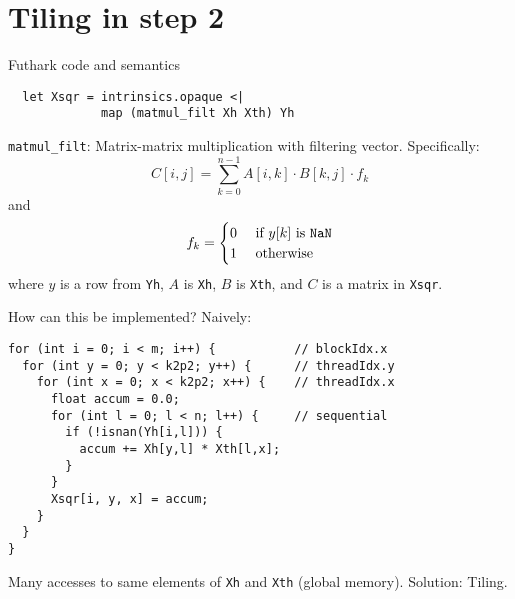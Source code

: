 

\section{Tiling in step 2}

\begin{frame}[fragile]{Futhark code and semantics}
\begin{verbatim}
  let Xsqr = intrinsics.opaque <|
             map (matmul_filt Xh Xth) Yh
\end{verbatim}
\texttt{matmul\_filt}: Matrix-matrix multiplication with filtering vector.
Specifically:
\[
  C[i,j]=\sum\limits_{k=0}^{n-1} A[i,k]\cdot B[k,j]\cdot f_k
\]
and
\[
  f_k =
  \begin{cases}
    0 & \mbox{ if } y[k] \mbox{ is \texttt{NaN}} \\
    1 & \mbox{ otherwise }
  \end{cases}
\]
where \(y\) is a row from \texttt{Yh}, \(A\) is \texttt{Xh}, \(B\) is
\texttt{Xth}, and \(C\) is a matrix in \texttt{Xsqr}.
\end{frame}

\begin{frame}[fragile]{How can this be implemented?}
  Naively:
\begin{verbatim}
for (int i = 0; i < m; i++) {           // blockIdx.x
  for (int y = 0; y < k2p2; y++) {      // threadIdx.y
    for (int x = 0; x < k2p2; x++) {    // threadIdx.x
      float accum = 0.0;
      for (int l = 0; l < n; l++) {     // sequential
        if (!isnan(Yh[i,l])) {
          accum += Xh[y,l] * Xth[l,x];
        }
      }
      Xsqr[i, y, x] = accum;
    }
  }
}
\end{verbatim}
Many accesses to same elements of \texttt{Xh} and \texttt{Xth} (global memory).
Solution: Tiling.
\end{frame}

